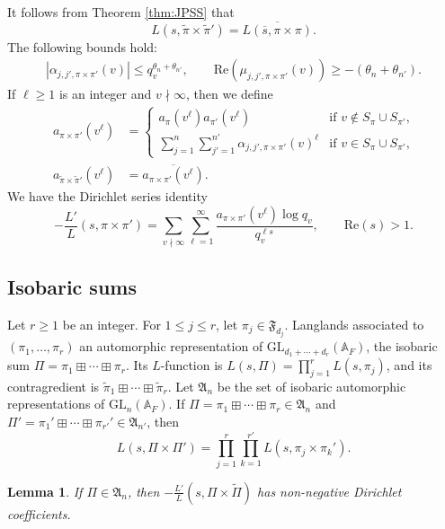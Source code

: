 \documentclass[11pt]{amsart}
\newtheorem{lemma}[theorem]{Lemma}
\theoremstyle{remark}
\numberwithin{equation}{section}
\begin{document}
It follows from Theorem \ref{thm:JPSS} that
\begin{equation}
	\label{eqn:dual}
	L(s,\widetilde{\pi}\times\widetilde{\pi}')=\overline{L(\overline{s},\pi\times\pi)}.
	\end{equation}
The following bounds hold:
	\begin{equation}
		\label{eqn:Ramanujan2}
		\begin{aligned}
	|\alpha_{j,j',\pi\times\pi'}(v)|\leq  q_v^{\theta_n+\theta_{n'}},\qquad \mathrm{Re}(\mu_{j,j',\pi\times\pi'}(v))\geq -(\theta_n+\theta_{n'}).
	\end{aligned}
	\end{equation}
	If $\ell\geq 1$ is an integer and $v\nmid\infty$, then we define
	\begin{equation}
	\label{eqn:a_def}
	\begin{aligned}
	a_{\pi\times\pi'}(v^{\ell})&= \begin{cases}
 	a_{\pi}(v^{\ell})a_{\pi'}(v^{\ell})&\mbox{if $v\notin S_{\pi}\cup S_{\pi'}$,}\\
 	\sum_{j=1}^n \sum_{j'=1}^{n'}\alpha_{j,j',\pi\times\pi'}(v)^{\ell}&\mbox{if $v\in S_{\pi}\cup S_{\pi'}$,}
 \end{cases}\\
 a_{\widetilde{\pi}\times\widetilde{\pi}'}(v^{\ell})&=\overline{a_{\pi\times\pi'}(v^{\ell})}.
 \end{aligned}
	\end{equation}
	We have the Dirichlet series identity
	\begin{equation}
		\label{eqn:log_deriv}
	-\frac{L'}{L}(s,\pi\times\pi')=\sum_{v\nmid\infty}\sum_{\ell=1}^{\infty}\frac{a_{\pi\times\pi'}(v^{\ell})\log q_v}{q_v^{\ell s}},\qquad\mathrm{Re}(s)>1.
	\end{equation}
	
\subsection{Isobaric sums}
\label{subsec:isobaric}

Let $r\geq 1$ be an integer.  For $1\leq j\leq r$, let $\pi_{j}\in\mathfrak{F}_{d_j}$.  Langlands associated to $(\pi_1,\ldots,\pi_r)$ an automorphic representation of $\mathrm{GL}_{d_1+\cdots+d_r}(\mathbb{A}_F)$, the isobaric sum $\Pi=\pi_1\boxplus\cdots\boxplus\pi_r$.  Its $L$-function is $L(s,\Pi)=\prod_{j=1}^r L(s,\pi_j)$, and its contragredient is $\widetilde{\pi}_1\boxplus\cdots\boxplus\widetilde{\pi}_r$.  Let $\mathfrak{A}_{n}$ be the set of isobaric automorphic representations of $\mathrm{GL}_n(\mathbb{A}_F)$.  If $\Pi=\pi_1\boxplus\cdots\boxplus\pi_r\in\mathfrak{A}_n$ and $\Pi'=\pi_1'\boxplus\cdots\boxplus\pi_{r'}'\in\mathfrak{A}_{n'}$, then
\[
L(s,\Pi\times\Pi')=\prod_{j=1}^r \prod_{k=1}^{r'} L(s,\pi_j\times\pi_k').
\]
\begin{lemma}\cite{HoffsteinRamakrishnan}
\label{lem:HR}
If $\Pi\in\mathfrak{A}_{n}$, then $-\frac{L'}{L}(s,\Pi\times\widetilde{\Pi})$ has non-negative Dirichlet coefficients.
\end{lemma}
\end{document}
